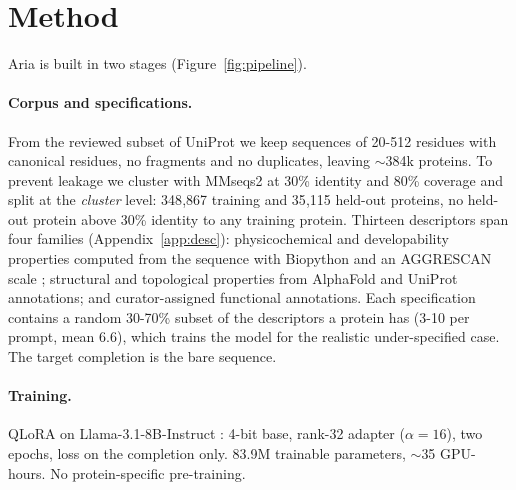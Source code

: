 \documentclass{article} %
\newcommand{\pct}{\%}
\begin{document}



\appendix
\setcounter{figure}{0}
\renewcommand{\thefigure}{A\arabic{figure}}
\setcounter{table}{0}
\renewcommand{\thetable}{A\arabic{table}}

\section{Method}\label{app:method}


Aria is built in two stages (Figure~\ref{fig:pipeline}). 

\paragraph{Corpus and specifications.} From the reviewed subset of UniProt
\citep{uniprot2023} we keep sequences of 20-512 residues with canonical
residues, no fragments and no duplicates, leaving $\sim$384k proteins. To
prevent leakage we cluster with MMseqs2 \citep{steinegger2017mmseqs2} at
30\pct{} identity and 80\pct{} coverage and split at the \emph{cluster} level:
348{,}867 training and 35{,}115 held-out proteins, no held-out protein above
30\pct{} identity to any training protein. Thirteen descriptors span four
families (Appendix~\ref{app:desc}): physicochemical and developability
properties computed from the sequence with Biopython \citep{cock2009biopython}
and an AGGRESCAN scale \citep{conchillosole2007aggrescan}; structural and
topological properties from AlphaFold \citep{jumper2021alphafold} and UniProt
annotations; and curator-assigned functional annotations. Each specification
contains a random 30-70\pct{} subset of the descriptors a protein has (3-10
per prompt, mean 6.6), which trains the model for the realistic
under-specified case. The target completion is the bare sequence.

\paragraph{Training.} QLoRA \citep{dettmers2023qlora, hu2022lora} on
Llama-3.1-8B-Instruct \citep{dubey2024llama3}: 4-bit base, rank-32 adapter
($\alpha=16$), two epochs, loss on the completion only. 83.9M trainable
parameters, $\sim$35 GPU-hours. No protein-specific pre-training.
\end{document}
